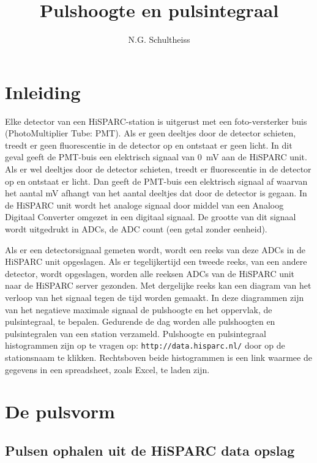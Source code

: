 



\title{Pulshoogte en pulsintegraal}
\author{N.G. Schultheiss}
\date{}

\maketitle

\section{Inleiding}

Elke detector van een HiSPARC-station is uitgerust met een foto-versterker
buis (PhotoMultiplier Tube: PMT). Als er geen deeltjes door de detector
schieten, treedt er geen fluorescentie in de detector op en ontstaat
er geen licht. In dit geval geeft de PMT-buis een elektrisch signaal
van \SI{0}{\milli\volt} aan de HiSPARC unit. Als er wel deeltjes door de detector
schieten, treedt er fluorescentie in de detector op en ontstaat
er licht. Dan geeft de PMT-buis een elektrisch signaal
af waarvan het aantal mV afhangt van het aantal deeltjes dat door de detector is gegaan. In de HiSPARC unit wordt het
analoge signaal door middel van een Analoog Digitaal Converter omgezet
in een digitaal signaal. De grootte van dit signaal wordt uitgedrukt
in ADCs, de ADC count (een getal zonder eenheid).

Als er een detectorsignaal gemeten wordt, wordt een reeks van deze
ADCs in de HiSPARC unit opgeslagen. Als er tegelijkertijd een tweede
reeks, van een andere detector, wordt opgeslagen, worden alle reeksen
ADCs van de HiSPARC unit naar de HiSPARC server gezonden. Met dergelijke
reeks kan een diagram van het verloop van het signaal tegen de tijd
worden gemaakt. In deze diagrammen zijn van het negatieve maximale signaal
de pulshoogte en het oppervlak, de pulsintegraal, te bepalen. Gedurende
de dag worden alle pulshoogten en pulsintegralen van een station verzameld.
Pulshoogte en pulsintegraal histogrammen zijn op te vragen op: \texttt{\small http://data.hisparc.nl/}
door op de stationsnaam te klikken. Rechtsboven beide histogrammen
is een link waarmee de gegevens in een spreadsheet, zoals Excel,
te laden zijn. 


\section{De pulsvorm}


\subsection{Pulsen ophalen uit de HiSPARC data opslag}


